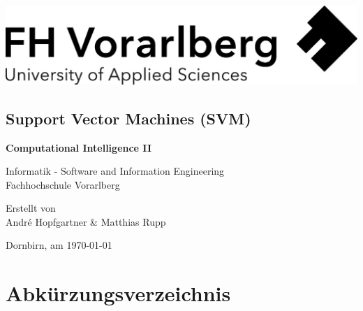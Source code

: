 \documentclass[a4paper,11pt,twoside]{scrreprt}
\begin{document}
\listoftodos


\cleardoublepage   %
\thispagestyle{empty}
\begin{titlepage}
  \begin{flushright}
  \includegraphics[width=0.4\linewidth]{assets/Logo-A3.jpg}
  \end{flushright}
  \begin{center}
  \section*{Support Vector Machines (SVM)}
  \vspace{2cm}

\textbf{Computational Intelligence II}    
\vspace{0.5cm}

  Informatik - Software and Information Engineering\\
  Fachhochschule Vorarlberg\\

  \vspace{1cm}
  
    Erstellt von\\
  André Hopfgartner \& Matthias Rupp\\
  
 
  \vspace{1cm}
  

  
  Dornbirn, am \today
  
  
  \end{center}
\end{titlepage}


\clearpage   %
\setcounter{tocdepth}{2}
\setcounter{secnumdepth}{4}
\tableofcontents

\clearpage
{}
{}
\chapter*{Abkürzungsverzeichnis}
\begin{acronym}
\end{acronym}
\end{document}
